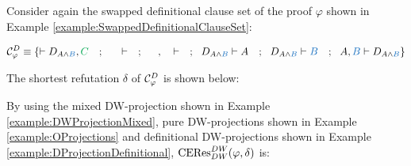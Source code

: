 \documentclass{llncs}
\begin{document}
\begin{example}

Consider again the swapped definitional clause set of the proof $\varphi$ shown in Example \ref{example:SwappedDefinitionalClauseSet}:

$$
\clausesetSwappedDefinitionalUnique{\varphi} \equiv  \left\{
	\seq D_{\hA{A} \structplus \hB{B}} , \hE{C} 
\ \ \ ; \ \
	\hF{C} \seq 
\ \ \ ; \ \
	\hC{B} , \hD{A} \seq
\ \ \ ; \ \
	D_{\hA{A} \structplus \hB{B}} \seq \hA{A}  
\ \ \ ; \ \
	D_{\hA{A} \structplus \hB{B}} \seq \hB{B} 
\ \ \ ; \ \
	\hA{A}, \hB{B} \seq D_{\hA{A} \structplus \hB{B}} 
\right\}
$$

The shortest refutation $\delta$ of $\mathcal{C}^{D}_{\varphi}$ is shown below:

\begin{prooftree}
		 
	\BIC{$\seq D_{\hA{A} \structplus \hB{B}}$}
								 
							 
					 
					 
			\BIC{$ \seq $}
\end{prooftree}

By using the mixed DW-projection shown in Example \ref{example:DWProjectionMixed}, pure DW-projections shown in Example \ref{example:OProjections} and definitional DW-projections shown in Example \ref{example:DProjectionDefinitional}, $\mathrm{CERes}^{DW}_{DW}(\varphi,\delta)$ is:



\end{example}
\end{document}
